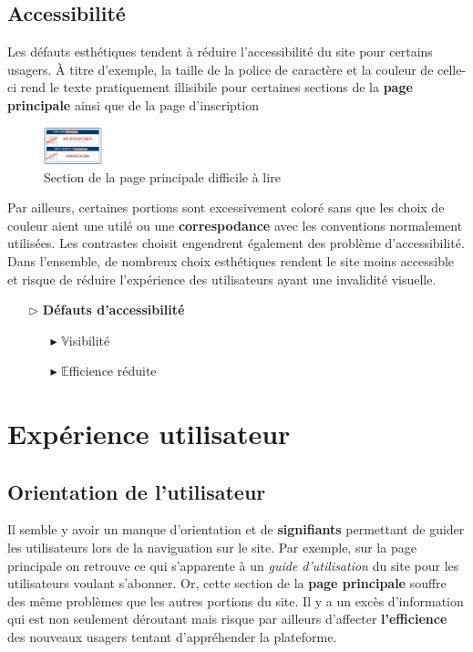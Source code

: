 \documentclass[9pt]{report}
\begin{document}
\begin{multicols*}{2}
  \subsection{Accessibilité}
  Les défauts esthétiques tendent à réduire l'accessibilité du site 
  pour certains usagers. À titre d'exemple, la taille de la police de 
  caractère et la couleur de celle-ci 
  rend le texte pratiquement illisibile pour certaines 
  sections de la \textbf{page principale} ainsi que de la page d'inscription 
  \begin{figure}[H]
    \begin{center}
      \includegraphics[width=0.15\textwidth]{PoliceIllisible.png}
    \end{center}
    \vspace{-1em}
    \caption{Section de la page principale difficile à lire}
  \end{figure}
  Par ailleurs, certaines portions sont excessivement coloré sans que 
  les choix de couleur aient une utilé ou une \textbf{correspodance}
  avec les conventions normalement utilisées. Les contrastes choisit 
  engendrent également des problème d'accessibilité. Dans l'ensemble, 
  de nombreux choix esthétiques rendent le site moins accessible et 
  risque de réduire l'expérience des utilisateurs ayant une 
  invalidité visuelle. 
  \begin{itemize}
    \item [$\rhd$ ] \textbf{Défauts d'accessibilité}  
      \begin{itemize}
        \item [$\blacktriangleright$ ] $\mathbb{V}$isibilité
        \item [$\blacktriangleright$ ] $\mathbb{E}$fficience réduite
      \end{itemize}
  \end{itemize}


  \section{Expérience utilisateur}

  \subsection{Orientation de l'utilisateur}
    Il semble y avoir un manque d'orientation  
    et de \textbf{signifiants} permettant de guider les utilisateurs 
    lors de la naviguation sur le site. Par exemple, sur la 
    page principale on retrouve ce qui s'apparente à un 
    \textit{guide d'utilisation} du site pour les utilisateurs 
    voulant s'abonner. Or, cette section de la  
    \textbf{page principale}  souffre des même problèmes
    que les autres portions du site. Il y a un excès d'information 
    qui est non seulement déroutant mais risque 
    par ailleurs d'affecter \textbf{l'efficience}  
    des nouveaux usagers tentant d'appréhender la plateforme.


\end{multicols*}
\end{document}

